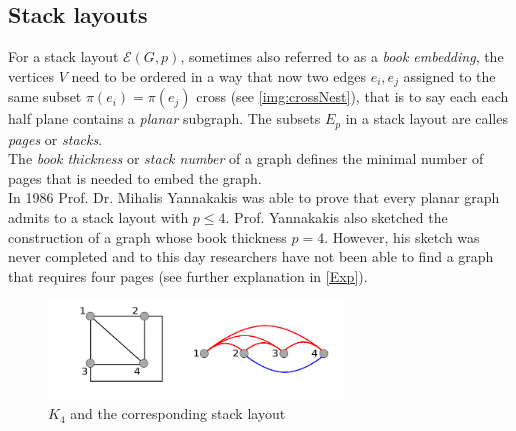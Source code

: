\subsection{Stack layouts}
For a stack layout $\mathcal{E}(G,p)$, sometimes also referred to as a \textit{book embedding}, the vertices $V$ need to be ordered in a way that now two edges $e_i, e_j$ assigned to the same subset $\pi(e_i) = \pi(e_j)$ cross (see \autoref{img:crossNest}), that is to say each each half plane contains a \textit{planar} subgraph. The subsets $E_p$ in a stack layout are calles \textit{pages} or \textit{stacks}.\\
The \textit{book thickness} or \textit{stack number} of a graph defines the minimal number of pages that is needed to embed the graph.\\
In 1986 Prof. Dr. Mihalis Yannakakis \cite{yannakakis1986four} was able to prove that every planar graph admits to a stack layout with $p \leq 4$. Prof. Yannakakis also sketched the construction of a graph whose book thickness $p = 4$. However, his sketch was never completed and to this day researchers have not been able to find a graph that requires four pages (see further explanation in \autoref{Exp}).
\begin{figure}[!h]
\begin{center}
\includegraphics[width=0.7\textwidth]{figures/K4Stack.png}
\caption{$K_4$ and the corresponding stack layout}
\label{img:stackGHG}
\end{center}
\end{figure}
